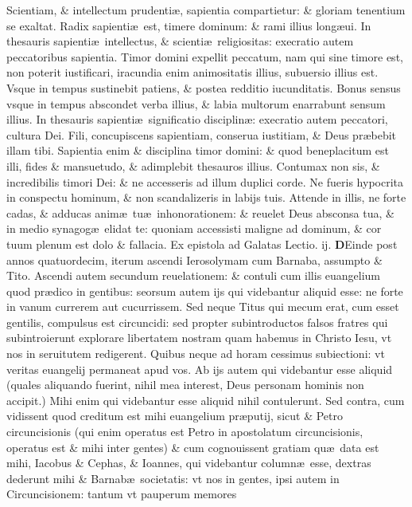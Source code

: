 \documentclass[a5paper,10pt]{book}
\def\rightmarginnote{%
	\lrmarginnote{\hskip\columnwidth \hskip -1em}}
\def\ae{æ}
\begin{document}
\begin{multicols*}{2}
Scientiam, \& intellectum prudenti\ae , sapientia compartietur: \& gloriam tenentium se exaltat. Radix sapienti\ae \ est, timere dominum: \& rami illius long\ae ui.
In thesauris sapienti\ae \ intellectus, \& scienti\ae \ religiositas: execratio autem peccatoribus sapientia.
Timor domini expellit
peccatum, nam qui sine timore est, non poterit iustificari, iracundia enim animositatis illius, subuersio illius est.
Vsque in tempus sustinebit patiens, \& postea redditio iucunditatis. Bonus sensus vsque in tempus abscondet verba illius, \& labia multorum enarrabunt sensum illius.
In thesauris sapienti\ae \ significatio disciplin\ae : execratio autem peccatori, cultura Dei.
Fili, concupiscens sapientiam, conserua iustitiam, \& Deus pr\ae bebit illam tibi. Sapientia enim \& disciplina timor domini: \& quod beneplacitum est illi, fides \& mansuetudo, \& adimplebit thesauros illius.
Contumax non sis, \& incredibilis timori Dei: \& ne accesseris ad illum duplici corde. Ne fueris hypocrita in conspectu hominum, \& non scandalizeris in labijs tuis.
Attende in illis, ne forte cadas, \& adducas anim\ae \ tu\ae \ inhonorationem: \& reuelet Deus absconsa tua, \& in medio synagog\ae \ elidat te: quoniam accessisti maligne ad dominum, \& cor tuum plenum est dolo \& fallacia.
\newline \color{red} Ex epistola ad Galatas \hfill Lectio. ij. \color{black}
\vspace{-.25em}
\lettrine[lines=2]{\bfseries \color{red} D}{}Einde\rightmarginnote{ca. 2.} post annos quatuordecim, iterum ascendi Ierosolymam cum Barnaba, assumpto \& Tito.
Ascendi autem secundum reuelationem: \& contuli cum illis euangelium quod pr\ae dico in gentibus: seorsum autem ijs qui videbantur aliquid esse: ne forte in vanum currerem aut cucurrissem.
Sed neque Titus qui mecum erat, cum esset gentilis, compulsus est circuncidi: sed propter subintroductos falsos fratres qui subintroierunt explorare libertatem nostram quam habemus in Christo Iesu, vt nos in seruitutem redigerent.
Quibus neque ad horam cessimus subiectioni: vt veritas euangelij permaneat apud vos.
Ab ijs autem qui videbantur esse aliquid (quales aliquando fuerint, nihil mea interest, Deus personam hominis non accipit.)
Mihi enim qui videbantur esse aliquid nihil contulerunt. Sed contra, cum vidissent quod creditum est mihi euangelium pr\ae putij, sicut \& Petro circuncisionis (qui enim operatus est Petro in apostolatum circuncisionis, operatus est \& mihi inter gentes) \& cum cognouissent gratiam qu\ae \ data est mihi, Iacobus \& Cephas, \& Ioannes, qui videbantur column\ae \ esse, dextras dederunt mihi \& Barnab\ae \ societatis: vt nos in gentes, ipsi autem in Circuncisionem: tantum vt pauperum memores

\end{multicols*}
\end{document}
